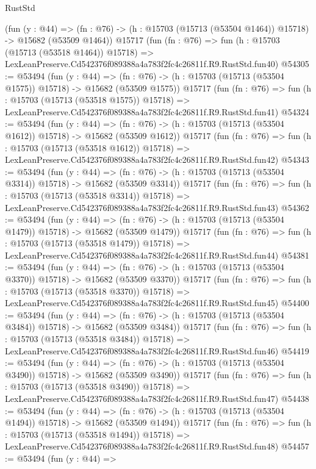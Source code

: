 \begin{lexlean}{RustStd}
\begin{coremodule}
    (fun (y : @44) =>
    (fn : @76) -> (h : @15703 (@15713 (@53504 @1464)) @15718) -> @15682 (@53509 @1464))
    @15717
    (fun (fn : @76) =>
    fun (h : @15703 (@15713 (@53518 @1464)) @15718) =>
    LexLeanPreserve.Cd542376f089388a4a783f2fc4c26811f.R9.RustStd.fun40)
@54305 := @53494
    (fun (y : @44) =>
    (fn : @76) -> (h : @15703 (@15713 (@53504 @1575)) @15718) -> @15682 (@53509 @1575))
    @15717
    (fun (fn : @76) =>
    fun (h : @15703 (@15713 (@53518 @1575)) @15718) =>
    LexLeanPreserve.Cd542376f089388a4a783f2fc4c26811f.R9.RustStd.fun41)
@54324 := @53494
    (fun (y : @44) =>
    (fn : @76) -> (h : @15703 (@15713 (@53504 @1612)) @15718) -> @15682 (@53509 @1612))
    @15717
    (fun (fn : @76) =>
    fun (h : @15703 (@15713 (@53518 @1612)) @15718) =>
    LexLeanPreserve.Cd542376f089388a4a783f2fc4c26811f.R9.RustStd.fun42)
@54343 := @53494
    (fun (y : @44) =>
    (fn : @76) -> (h : @15703 (@15713 (@53504 @3314)) @15718) -> @15682 (@53509 @3314))
    @15717
    (fun (fn : @76) =>
    fun (h : @15703 (@15713 (@53518 @3314)) @15718) =>
    LexLeanPreserve.Cd542376f089388a4a783f2fc4c26811f.R9.RustStd.fun43)
@54362 := @53494
    (fun (y : @44) =>
    (fn : @76) -> (h : @15703 (@15713 (@53504 @1479)) @15718) -> @15682 (@53509 @1479))
    @15717
    (fun (fn : @76) =>
    fun (h : @15703 (@15713 (@53518 @1479)) @15718) =>
    LexLeanPreserve.Cd542376f089388a4a783f2fc4c26811f.R9.RustStd.fun44)
@54381 := @53494
    (fun (y : @44) =>
    (fn : @76) -> (h : @15703 (@15713 (@53504 @3370)) @15718) -> @15682 (@53509 @3370))
    @15717
    (fun (fn : @76) =>
    fun (h : @15703 (@15713 (@53518 @3370)) @15718) =>
    LexLeanPreserve.Cd542376f089388a4a783f2fc4c26811f.R9.RustStd.fun45)
@54400 := @53494
    (fun (y : @44) =>
    (fn : @76) -> (h : @15703 (@15713 (@53504 @3484)) @15718) -> @15682 (@53509 @3484))
    @15717
    (fun (fn : @76) =>
    fun (h : @15703 (@15713 (@53518 @3484)) @15718) =>
    LexLeanPreserve.Cd542376f089388a4a783f2fc4c26811f.R9.RustStd.fun46)
@54419 := @53494
    (fun (y : @44) =>
    (fn : @76) -> (h : @15703 (@15713 (@53504 @3490)) @15718) -> @15682 (@53509 @3490))
    @15717
    (fun (fn : @76) =>
    fun (h : @15703 (@15713 (@53518 @3490)) @15718) =>
    LexLeanPreserve.Cd542376f089388a4a783f2fc4c26811f.R9.RustStd.fun47)
@54438 := @53494
    (fun (y : @44) =>
    (fn : @76) -> (h : @15703 (@15713 (@53504 @1494)) @15718) -> @15682 (@53509 @1494))
    @15717
    (fun (fn : @76) =>
    fun (h : @15703 (@15713 (@53518 @1494)) @15718) =>
    LexLeanPreserve.Cd542376f089388a4a783f2fc4c26811f.R9.RustStd.fun48)
@54457 := @53494
    (fun (y : @44) =>

\end{coremodule}
\end{lexlean}

